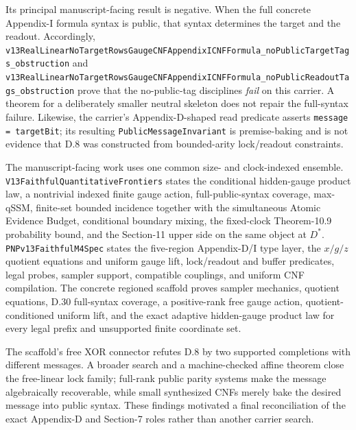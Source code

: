 \documentclass[11pt]{article}
\theoremstyle{definition}
\begin{document}
Its principal manuscript-facing result is negative.  When the full concrete
Appendix-I formula syntax is public, that syntax determines the target and the
readout.  Accordingly,
\texttt{v13RealLinearNoTargetRowsGaugeCNFAppendixICNFFormula\_noPublicTargetTags\_obstruction}
and
\texttt{v13RealLinearNoTargetRowsGaugeCNFAppendixICNFFormula\_noPublicReadoutTags\_obstruction}
prove that the no-public-tag disciplines \emph{fail} on this carrier.  A theorem for
a deliberately smaller neutral skeleton does not repair the full-syntax failure.
Likewise, the carrier's Appendix-D-shaped read predicate asserts
\texttt{message = targetBit}; its resulting \texttt{PublicMessageInvariant} is
premise-baking and is not evidence that D.8 was constructed from bounded-arity
lock/readout constraints.

The manuscript-facing work uses one common size- and clock-indexed ensemble.
\texttt{V13FaithfulQuantitativeFrontiers} states the
conditional hidden-gauge product law, a nontrivial indexed finite gauge action,
full-public-syntax coverage, max-qSSM, finite-set bounded incidence together with
the simultaneous Atomic Evidence Budget, conditional boundary mixing, the
fixed-clock Theorem-10.9 probability bound, and the Section-11 upper side on the
same object at $D^\ast$.  \texttt{PNPv13FaithfulM4Spec} states the five-region
Appendix-D/I type layer, the $x/g/z$ quotient equations and uniform gauge lift,
lock/readout and buffer predicates, legal probes, sampler support, compatible
couplings, and uniform CNF compilation. The concrete regioned scaffold proves
sampler mechanics, quotient equations, D.30 full-syntax coverage, a positive-rank
free gauge action, quotient-conditioned uniform lift, and the exact adaptive
hidden-gauge product law for every legal prefix and unsupported finite coordinate
set.

The scaffold's free XOR connector refutes D.8 by two supported completions with
different messages. A broader search and a machine-checked affine theorem close
the free-linear lock family; full-rank public parity systems make the message
algebraically recoverable, while small synthesized CNFs merely bake the desired
message into public syntax. These findings motivated a final reconciliation of
the exact Appendix-D and Section-7 roles rather than another carrier search.
\end{document}
